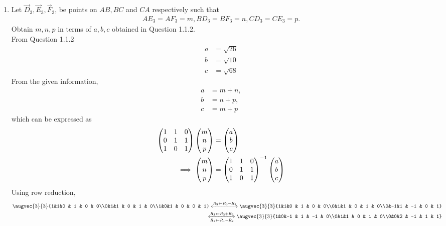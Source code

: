 \documentclass[11pt]{book}
\begin{document}
\begin{enumerate}[label=\thesection.\arabic*.,ref=\thesection.\theenumi]


\item Let $\vec{D}_3, \vec{E}_3, \vec{F}_3$, be points on $AB, BC$ and $CA$ respectively such that
\begin{align}
AE_3 = AF_3 = m, BD_3 = BF_3 = n, CD_3 = CE_3 = p.
\end{align}
Obtain $m,n,p$ in terms of $a,b,c$ obtained in Question 1.1.2. \\ 
\solution 
From Question 1.1.2
\begin{align}
    a &= \sqrt{26} \\ b &= \sqrt{10} \\ c &= \sqrt{68}
\end{align}
From the given information, 
\begin{align}
% 
    a &= m+n,\\
    b &= n+p, \\
    c &= m+p 
\end{align}
which can be expressed as
\begin{align}
\begin{pmatrix}1&1&0\\0&1&1\\1&0&1\\\end{pmatrix}\begin{pmatrix}m\\n\\p\end{pmatrix} &= \begin{pmatrix}a\\b\\c\end{pmatrix}
\\
\implies 
	\begin{pmatrix}m\\n\\p\end{pmatrix} &= \begin{pmatrix}1&1&0\\0&1&1\\1&0&1\\\end{pmatrix}^{-1}\begin{pmatrix}a\\b\\c\end{pmatrix}
\end{align}
Using row reduction,
\begin{align}
			\augvec{3}{3}{1&1&0 & 1 & 0 & 0\\0&1&1 & 0 & 1 & 0\\1&0&1 & 0 & 0 & 1}
			\xleftrightarrow[]{R_3 \leftarrow R_3 - R_1}
			\augvec{3}{3}{1&1&0 & 1 & 0 & 0\\0&1&1 & 0 & 1 & 0\\0&-1&1 & -1 & 0 & 1} \\
			\xleftrightarrow[R_1 \leftarrow R_1 - R_2]{R_3 \leftarrow R_3 + R_2}
			\augvec{3}{3}{1&0&-1 & 1 & -1 & 0\\0&1&1 & 0 & 1 & 0\\0&0&2 & -1 & 1 & 1} \\

\end{align}
\end{enumerate}
\end{document}
